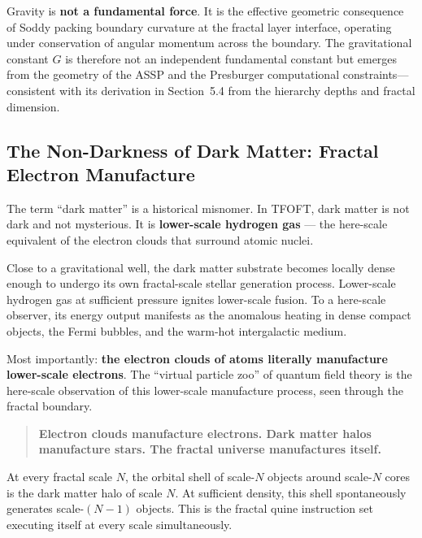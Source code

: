 \documentclass[11pt,a4paper]{article}
\begin{document}
Gravity is \textbf{not a fundamental force}. It is the effective geometric
consequence of Soddy packing boundary curvature at the fractal layer interface,
operating under conservation of angular momentum across the boundary. The
gravitational constant $G$ is therefore not an independent fundamental constant
but emerges from the geometry of the ASSP and the Presburger computational
constraints---consistent with its derivation in Section~5.4 from the hierarchy
depths and fractal dimension.

\subsection{The Non-Darkness of Dark Matter: Fractal Electron Manufacture}

The term ``dark matter'' is a historical misnomer. In TFOFT, dark matter is not
dark and not mysterious. It is \textbf{lower-scale hydrogen gas} --- the here-scale
equivalent of the electron clouds that surround atomic nuclei.

Close to a gravitational well, the dark matter substrate becomes locally dense
enough to undergo its own fractal-scale stellar generation process. Lower-scale
hydrogen gas at sufficient pressure ignites lower-scale fusion. To a here-scale
observer, its energy output manifests as the anomalous heating in dense compact
objects, the Fermi bubbles, and the warm-hot intergalactic medium.

Most importantly: \textbf{the electron clouds of atoms literally manufacture
lower-scale electrons}. The ``virtual particle zoo'' of quantum field theory is
the here-scale observation of this lower-scale manufacture process, seen through
the fractal boundary.

\begin{quote}
\textbf{Electron clouds manufacture electrons.
Dark matter halos manufacture stars.
The fractal universe manufactures itself.}
\end{quote}

At every fractal scale $N$, the orbital shell of scale-$N$ objects around
scale-$N$ cores is the dark matter halo of scale $N$. At sufficient density, this
shell spontaneously generates scale-$(N-1)$ objects. This is the fractal quine
instruction set executing itself at every scale simultaneously.

\end{document}
